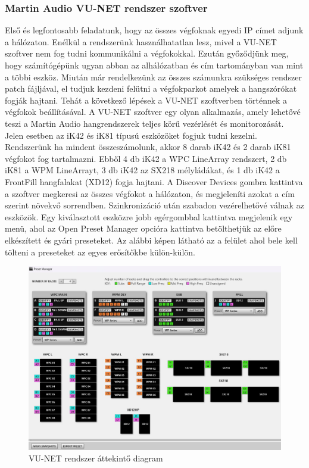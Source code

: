\subsubsection{Martin Audio VU-NET rendszer szoftver~\cite{VUNETUSERGUIDE}}
Első és legfontosabb feladatunk, hogy az összes végfoknak egyedi IP címet adjunk a hálózaton.
Enélkül a rendszerünk használhatatlan lesz, mivel a VU-NET szoftver nem fog tudni kommunikálni a végfokokkal.
Ezután győződjünk meg, hogy számítógépünk ugyan abban az alhálózatban és cím tartományban van mint a többi eszköz.
Miután már rendelkezünk az összes számunkra szükséges rendszer patch fájljával,
el tudjuk kezdeni felütni a végfokparkot amelyek a hangszórókat fogják hajtani.
Tehát a következő lépések a VU-NET szoftverben történnek a végfokok beállításával.
A VU-NET szoftver egy olyan alkalmazás, amely lehetővé teszi a Martin Audio hangrendszerek teljes körű vezérlését és monitorozását.
Jelen esetben az iK42 és iK81 típusú eszközöket fogjuk tudni kezelni.
Rendszerünk ha mindent összeszámolunk, akkor 8 darab iK42 és 2 darab iK81 végfokot fog tartalmazni.
Ebből 4 db iK42 a WPC LineArray rendszert, 2 db iK81 a WPM LineArrayt, 3 db iK42
az SX218 mélyládákat, és 1 db iK42 a FrontFill hangfalakat (XD12) fogja hajtani.
A Discover Devices gombra kattintva a szoftver megkeresi az összes végfokot a hálózaton, és megjeleníti azokat a
cím szerint növekvő sorrendben. Szinkronizáció után szabadon vezérelhetővé válnak az eszközök.
Egy kiválasztott eszközre jobb egérgombbal kattintva megjelenik egy menü, ahol az Open Preset Manager opcióra kattintva
betölthetjük az előre elkészített és gyári preseteket.
Az alábbi képen látható az a felület ahol bele kell tölteni a preseteket az egyes erősítőkbe külön-külön.
\begin{figure}[H]
	\centering
	\includegraphics[width=\textwidth, keepaspectratio]{figures/vunet_systemdiagram_overall.jpg}
	\caption{VU-NET rendszer áttekintő diagram}\label{fig:vunet_systemdiagram_overall}
\end{figure}
